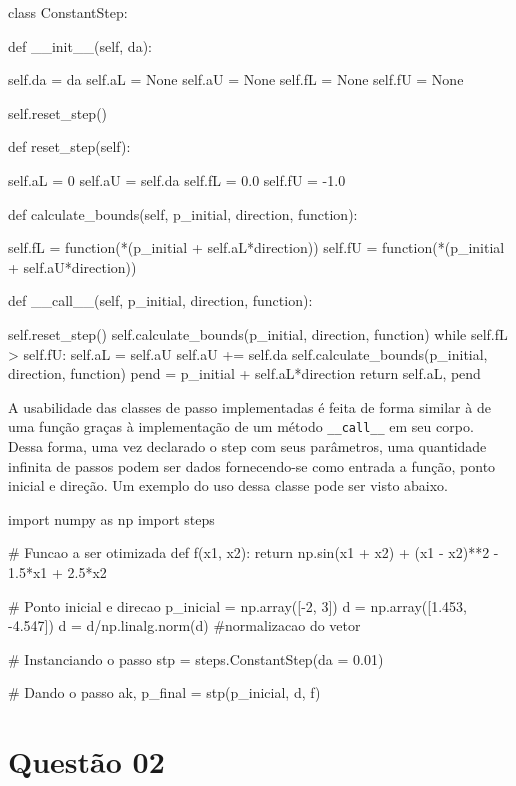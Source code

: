 \documentclass[10pt, a4paper]{article}
\begin{document}
\begin{python}
class ConstantStep:
    
    def __init__(self, da):

        self.da = da
        self.aL = None
        self.aU = None
        self.fL = None
        self.fU = None

        self.reset_step()

    def reset_step(self):

        self.aL = 0
        self.aU = self.da
        self.fL =  0.0
        self.fU = -1.0

    def calculate_bounds(self, p_initial, direction, function):

        self.fL = function(*(p_initial + self.aL*direction))
        self.fU = function(*(p_initial + self.aU*direction))

    def __call__(self, p_initial, direction, function):
        
        self.reset_step()
        self.calculate_bounds(p_initial, direction, function)
        while self.fL > self.fU:
            self.aL = self.aU
            self.aU += self.da
            self.calculate_bounds(p_initial, direction, function)
        pend = p_initial + self.aL*direction
        return self.aL, pend
\end{python}

A usabilidade das classes de passo implementadas é feita de forma similar à de uma função graças à implementação de um método {\tt \_\_call\_\_}
em seu corpo. Dessa forma, uma vez declarado o step com seus parâmetros, uma quantidade infinita de passos podem ser dados fornecendo-se como
entrada a função, ponto inicial e direção. Um exemplo do uso dessa classe pode ser visto abaixo.

\begin{python}
import numpy as np
import steps

# Funcao a ser otimizada
def f(x1, x2):
    return np.sin(x1 + x2) + (x1 - x2)**2 - 1.5*x1 + 2.5*x2

# Ponto inicial e direcao
p_inicial = np.array([-2, 3])
d = np.array([1.453, -4.547])
d = d/np.linalg.norm(d) #normalizacao do vetor

# Instanciando o passo
stp = steps.ConstantStep(da = 0.01)

# Dando o passo
ak, p_final = stp(p_inicial, d, f)
\end{python}

\newpage
\section{Questão 02}
\end{document}
